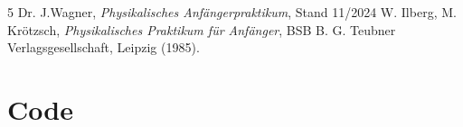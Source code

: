 \documentclass[12pt,a4paper,titlepage]{scrartcl}
\numberwithin{equation}{section}
\numberwithin{table}{section}
\numberwithin{figure}{section}
\begin{document}
\clearpage

\listoffigures


\listoftables

\begin{thebibliography}{5}
     Dr. J.Wagner, \emph{Physikalisches Anfängerpraktikum}, Stand 11/2024
     W. Ilberg, M. Krötzsch, \emph{Physikalisches Praktikum für Anfänger}, BSB B. G. Teubner Verlagsgesellschaft, Leipzig (1985).
\end{thebibliography}

\appendix
\section{Code}

\end{document}
